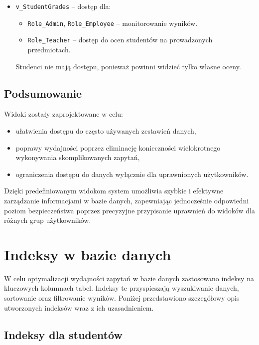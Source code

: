 \documentclass[12pt]{article}
\begin{document}
\begin{itemize}
    \item \texttt{v\_StudentGrades} -- dostęp dla:
        \begin{itemize}
            \item \texttt{Role\_Admin}, \texttt{Role\_Employee} -- monitorowanie wyników.
            \item \texttt{Role\_Teacher} -- dostęp do ocen studentów na prowadzonych przedmiotach.
        \end{itemize}
        Studenci nie mają dostępu, ponieważ powinni widzieć tylko własne oceny.
\end{itemize}


\subsection{Podsumowanie}

\noindent Widoki zostały zaprojektowane w celu:
\begin{itemize}
    \item ułatwienia dostępu do często używanych zestawień danych,
    \item poprawy wydajności poprzez eliminację konieczności wielokrotnego wykonywania skomplikowanych zapytań,
    \item ograniczenia dostępu do danych wyłącznie dla uprawnionych użytkowników.
\end{itemize}

\noindent Dzięki predefiniowanym widokom system umożliwia szybkie i efektywne zarządzanie informacjami w bazie danych, zapewniając jednocześnie odpowiedni poziom bezpieczeństwa poprzez precyzyjne przypisanie uprawnień do widoków dla różnych grup użytkowników.

\newpage
\section{Indeksy w bazie danych}
\label{sec:indeksy}

\noindent W celu optymalizacji wydajności zapytań w bazie danych zastosowano indeksy na kluczowych kolumnach tabel. Indeksy te przyspieszają wyszukiwanie danych, sortowanie oraz filtrowanie wyników. Poniżej przedstawiono szczegółowy opis utworzonych indeksów wraz z ich uzasadnieniem.

\subsection{Indeksy dla studentów}
\end{document}
